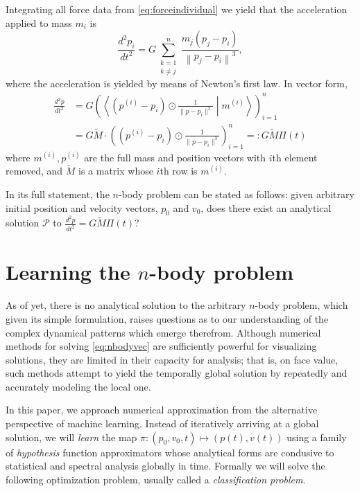 \documentclass{article}
\numberwithin{theorem}{section}
\numberwithin{equation}{section}
\def\scriptp{{\mathcal P}}
\begin{document}
Integrating all force data from \eqref{eq:forceindividual} we yield that the acceleration applied to mass $m_i$ is
\begin{equation}
	\frac{d^2p_i}{dt^2}= G \sum_{\substack{k=1 \\ k\neq j}}^n  \frac{ m_j(p_j - p_i)}{\left\|p_j - p_i\right\|^3},
\end{equation}
where the acceleration is yielded by means of Newton's first law. In vector form,
\begin{equation}\label{eq:nbodyvec}
\begin{aligned}
	\frac{d^2p}{dt^2} &= G \left({\left\langle \left(p^{(i)} - p_i\right)\odot \frac{1}{\|p - p_i\|^3} \mathrel{}\middle|\mathrel{} m^{(i)} \right\rangle}\right)_{i=1}^n \\
	&= G  \tilde{M} \cdot \left(\left(p^{(i)} - p_i\right)\odot \frac{1}{\|p - p_i\|^3} \right)_{i=1}^n =: G \tilde{M}  \Pi(t)
\end{aligned}
\end{equation}
where $m^{(i)}, p^{(i)}$ are the full mass and position vectors with $i$th element removed, and $\tilde{M}$ is a matrix whose $i$th row is $m^{(i)}$.

In its full statement, the $n$-body problem can be stated as follows: given arbitrary initial position and velocity vectors, $p_0$ and $v_0$, does there exist an analytical solution $\scriptp$ to $\frac{d^2p}{dt^2} = G \tilde{M}  \Pi(t)$?


\section{Learning the $n$-body problem}
As of yet, there is no analytical solution to the arbitrary $n$-body problem, which given its simple formulation, raises questions as to our understanding of the complex dynamical patterns which emerge therefrom. Although numerical methods for solving \eqref{eq:nbodyvec} are sufficiently powerful for visualizing solutions, they are limited in their capacity for analysis; that is, on face value, such methods attempt to yield the temporally global solution by repeatedly and accurately modeling the local one. 

 In this paper, we approach numerical approximation from the alternative perspective of machine learning. Instead of iteratively arriving at a global solution, we will \emph{learn} the map $\pi: (p_0, v_0, t) \mapsto (p(t), v(t))$ using a family of \emph{hypothesis} function approximators whose analytical forms are condusive to statistical and spectral analysis globally in time.  Formally we will solve the following optimization problem, usually called a \emph{classification problem}.
\end{document}
